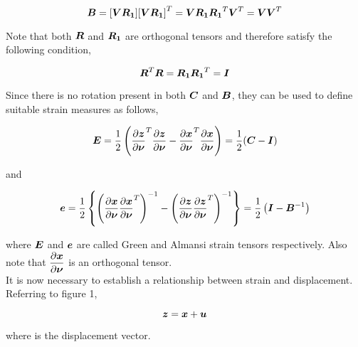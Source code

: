 \begin{equation}
  \matr{B}=[\matr{V}\matr{R_{1}}]\transpose{[\matr{V}\matr{R_{1}}]}=\matr{V}\matr{R_{1}}\transpose{\matr{R_{1}}}\transpose{\matr{V}}=\matr{V}\transpose{\matr{V}}
  \label{eqn:leftcauchy}
\end{equation}

\noindent Note that both $\matr{R}$ and $\matr{R_{1}}$ are orthogonal tensors
and therefore satisfy the following condition,

\begin{equation}
  \transpose{\matr{R}}\matr{R}=\matr{R_{1}}\transpose{\matr{R_{1}}}=\matr{I}
  \label{eqn:orthoganality}
\end{equation}

Since there is no rotation present in both $\matr{C}$ and $\matr{B}$, they can
be used to define suitable strain measures as follows,

\begin{equation}
  \matr{E}=\frac{1}{2}\pbrac{\transpose{\delby{\vect{z}}{\vect{\nu}}}\delby{\vect{z}}{\vect{\nu}}-
                       \transpose{\delby{\vect{x}}{\vect{\nu}}}\delby{\vect{x}}{\vect{\nu}}}=
	    \frac{1}{2}(\matr{C}-\matr{I})	       
  \label{eqn:greenstrain}
\end{equation}

\noindent and

\begin{equation}
  \vect{e}=\frac{1}{2}\bbrac{\pbrac{\delby{\vect{x}}{\vect{\nu}}\transpose{\delby{\vect{x}}{\vect{\nu}}}}^{-1}-
                             \pbrac{\delby{\vect{z}}{\vect{\nu}}\transpose{\delby{\vect{z}}{\vect{\nu}}}}^{-1}}=
			     \frac{1}{2}\pbrac{\matr{I}-\matr{B}^{-1}}  
  \label{eqn:almansistrain}
\end{equation}

\noindent where $\matr{E}$ and $\vect{e}$ are called Green and Almansi strain tensors respectively. 
Also note that $\delby{\vect{x}}{\vect{\nu}}$ is an orthogonal tensor. \\

It is now necessary to establish a relationship between strain and displacement. Referring to figure 1, 

\begin{equation}
  \vect{z}=\vect{x}+\vect{u}
  \label{eqn:displacement}
\end{equation}

\noindent where  is the displacement vector. \\

